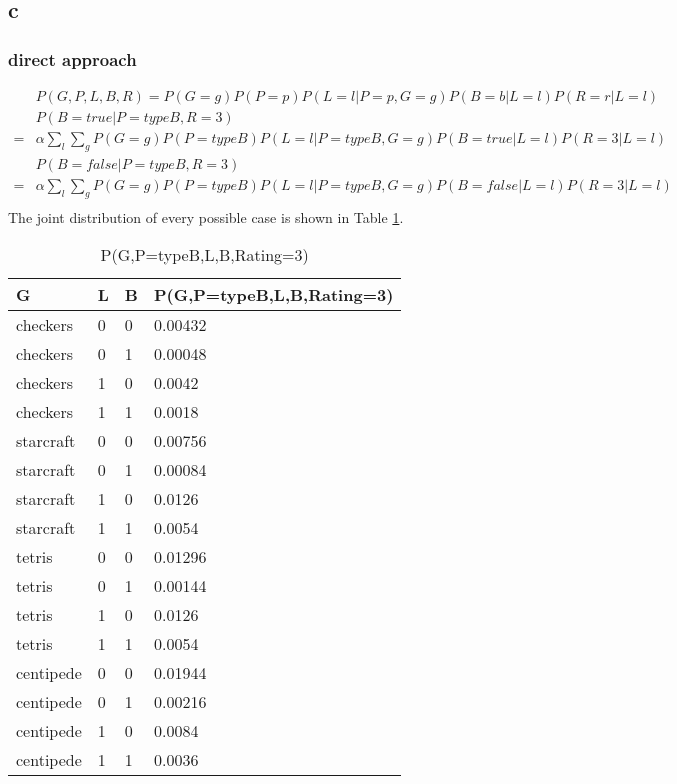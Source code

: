 \documentclass[12pt]{article}
\begin{document}
\subsection{c}
\subsubsection{direct approach}
\begin{align*}
  &P(G,P,L,B,R)=P(G=g)P(P=p)P(L=l|P=p,G=g)P(B=b|L=l)P(R=r|L=l)\\
  &P(B=true | P=typeB, R=3)\\
  =& \alpha \sum_l \sum_g P(G=g)P(P=typeB)P(L=l|P=typeB,G=g)P(B=true|L=l)P(R=3|L=l)\\
  &P(B=false | P=typeB, R=3)\\
  =& \alpha \sum_l \sum_g P(G=g)P(P=typeB)P(L=l|P=typeB,G=g)P(B=false|L=l)P(R=3|L=l)\\
\end{align*}
The joint distribution of every possible case is shown in Table \ref{tab:game}.
\begin{table}
  \centering
  \begin{tabularx}{\textwidth}{|X|X|X|l|} \hline
    G & L & B & P(G,P=typeB,L,B,Rating=3) \\ \hline
    checkers & 0 & 0 & 0.00432 \\ \hline
    checkers & 0 & 1 & 0.00048 \\ \hline
    checkers & 1 & 0 & 0.0042 \\ \hline
    checkers & 1 & 1 & 0.0018 \\ \hline
    starcraft & 0 & 0 & 0.00756 \\ \hline
    starcraft & 0 & 1 & 0.00084 \\ \hline
    starcraft & 1 & 0 & 0.0126 \\ \hline
    starcraft & 1 & 1 & 0.0054 \\ \hline
    tetris & 0 & 0 & 0.01296 \\ \hline
    tetris & 0 & 1 & 0.00144 \\ \hline
    tetris & 1 & 0 & 0.0126 \\ \hline
    tetris & 1 & 1 & 0.0054 \\ \hline
    centipede & 0 & 0 & 0.01944 \\ \hline
    centipede & 0 & 1 & 0.00216 \\ \hline
    centipede & 1 & 0 & 0.0084 \\ \hline
    centipede & 1 & 1 & 0.0036 \\ \hline
  \end{tabularx}
  \caption{P(G,P=typeB,L,B,Rating=3)}
  \label{tab:game}
\end{table}
\end{document}
